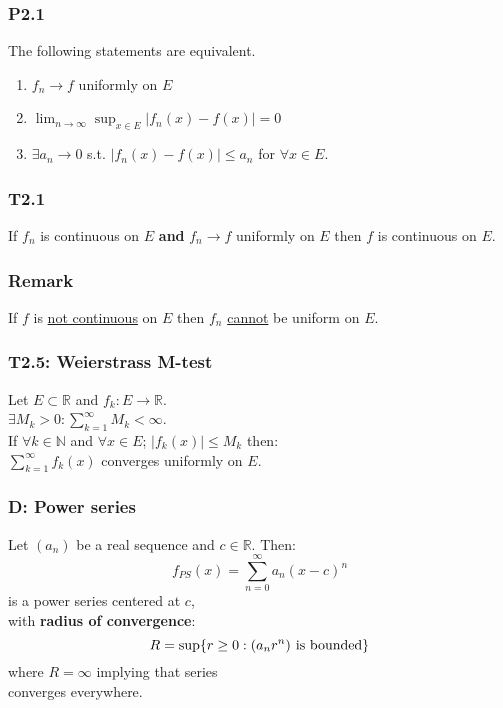\documentclass{article}
\begin{document}
\begin{multicols*}{3}
\subsubsection*{P2.1}
The following statements are equivalent.
\begin{enumerate}
    \item $f_n\rightarrow f$ uniformly on $E$
    \item $\displaystyle\lim_{n\rightarrow\infty}
    \sup_{x\in E}|f_n(x)-f(x)|=0$
    \item $\exists a_n\rightarrow0$ s.t.
    $|f_n(x)-f(x)|\leq a_n$ for $\forall x\in E$.
\end{enumerate}

\subsubsection*{T2.1}
If $f_n$ is continuous on $E$ \textbf{and}
$f_n\rightarrow f$ uniformly on $E$
then $f$ is continuous on $E$.

\subsubsection*{Remark}
If $f$ is \underline{not continuous} on $E$
then $f_n$ \underline{cannot} be uniform on $E$.

\subsubsection*{T2.5: Weierstrass M-test}
Let $E\subset\mathbb{R}$ and
$f_k:E\rightarrow\mathbb{R}$. \\
$\exists M_k>0 : \displaystyle
\sum_{k=1}^{\infty}M_k<\infty$. \\
If $\forall k\in\mathbb{N}$
and $\forall x\in E$;
$|f_k(x)|\leq M_k$
then: \\
$\displaystyle\sum_{k=1}^{\infty}f_k(x)$
converges uniformly on $E$.

\subsubsection*{D: Power series}
Let $(a_n)$ be a real sequence and $c\in\mathbb{R}$. Then:
$$f_{PS}(x)=\sum_{n=0}^{\infty}a_n(x-c)^n$$
is a power series centered at $c$, \\
with \textbf{radius of convergence}:
$$R=\sup\{r\geq0:(a_n r^n)\hspace{0.05in}
\text{is bounded}\}$$
where $R=\infty$ implying that series \\
converges everywhere.


\end{multicols*}
\end{document}
